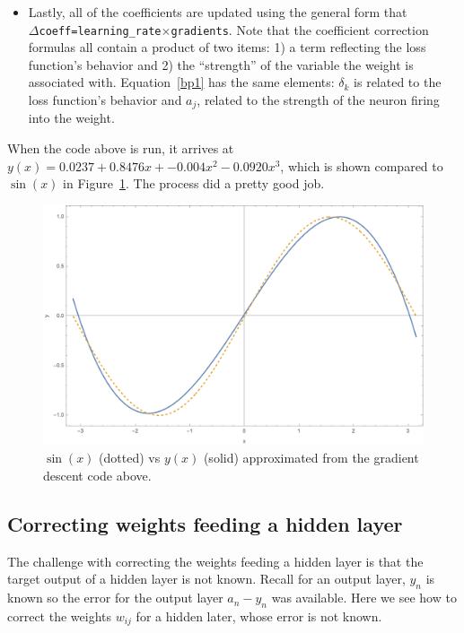 \documentclass[12pt]{article}
\begin{document}
\begin{itemize}
\item Lastly, all of the coefficients are updated using the general form that
\\
$\Delta$\verb|coeff=learning_rate|$\times$\verb|gradients|.  Note that the coefficient correction formulas all contain a product of two items: 1) a term reflecting the loss function's behavior and 2) the ``strength'' of the variable the weight is associated with.  Equation~\ref{bp1} has the same elements: $\delta_k$ is related to the loss function's behavior and $a_j$, related to the strength of the neuron firing into the weight.

\end{itemize}
When the code above is run, it arrives at $y(x) =  0.0237 +  0.8476 x + -0.004 x^2 -0.0920 x^3$, which is shown compared to  $\sin(x)$ in Figure~\ref{bp_sin}. The process did a pretty good job.


\begin{figure}[h]
\begin{center}
\includegraphics[scale=0.6]{Figs/bp_sin.png}
\caption{$\sin(x)$ (dotted) vs $y(x)$ (solid) approximated from the gradient descent code above.}
\label{bp_sin}
\end{center}
\end{figure}


\subsection{Correcting weights feeding a hidden layer}

The challenge with correcting the weights feeding a  hidden layer is that the target output of a hidden layer is not known.  Recall for an output layer, $y_n$ is known so the error for the output layer $a_n-y_n$ was available. Here we see how to correct the weights $w_{ij}$ for a hidden later, whose error is not known.
\end{document}
